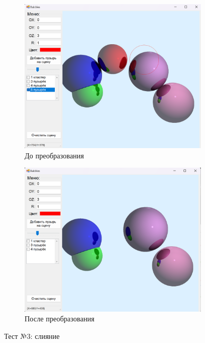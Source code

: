 \begin{figure}[h]
	\centering
	\begin{subfigure}{0.45\textwidth}
		\includegraphics[width=\linewidth]{pictures/test3_1.png}
		\caption{До преобразования}
		\label{fig:3first}
	\end{subfigure}
	\hfill
	\begin{subfigure}{0.45\textwidth}
		\includegraphics[width=\linewidth]{pictures/test3_2.png}
		\caption{После преобразования}
		\label{fig:3second}
	\end{subfigure}
	\caption{Тест №3: слияние}
	\label{fig:test3}
\end{figure}
